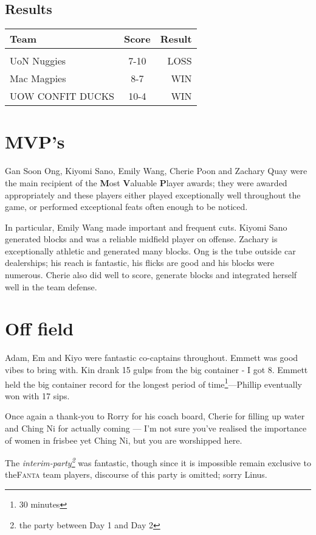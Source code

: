 \documentclass[12pt]{article}
\begin{document}
\subsection{Results}
\begin{center}
\begin{tabular}{lcr}
	Team & Score & Result\\
	\hline\\
	UoN Nuggies & 7-10 & \textsc{LOSS}\\
	Mac Magpies & 8-7 & \textsc{WIN}\\
	UOW CONFIT DUCKS & 10-4 & \textsc{WIN}\\
\end{tabular}
\end{center}

\newpage
\enlargethispage{.5in}
\section{MVP's}
Gan Soon Ong, Kiyomi Sano, Emily Wang, Cherie Poon and Zachary Quay were the main recipient of the \textbf{M}ost \textbf{V}aluable \textbf{P}layer awards; they were awarded appropriately and these players either played exceptionally well throughout the game, or performed exceptional feats often enough to be noticed.

In particular, Emily Wang made important and frequent cuts. Kiyomi Sano generated blocks and was a reliable midfield player on offense. Zachary is exceptionally athletic and generated many blocks. Ong is the tube outside car dealerships; his reach is fantastic, his flicks are good and his blocks were numerous. Cherie also did well to score, generate blocks and integrated herself well in the team defense.

\section{Off field}
Adam, Em and Kiyo were fantastic co-captains throughout. Emmett was good vibes to bring with. Kin drank 15 gulps from the big container - I got 8. Emmett held the big container record for the longest period of time\footnote{30 minutes}---Phillip eventually won with 17 sips.

Once again a thank-you to Rorry for his coach board, Cherie for filling up water and Ching Ni for actually coming --- I'm not sure you've realised the importance of women in frisbee yet Ching Ni, but you are worshipped here.

The \emph{interim-party\footnote{the party between Day 1 and Day 2}} was fantastic, though since it is impossible remain exclusive to the\textsc{Fanta} team players, discourse of this party is omitted; sorry Linus.
\end{document}
